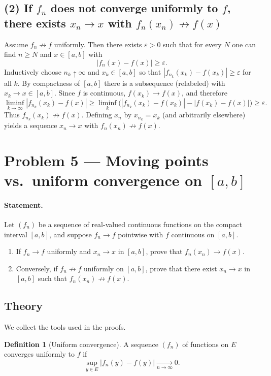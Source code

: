 \documentclass[12pt,a4paper]{article}
\theoremstyle{plain}
\theoremstyle{definition}
\newtheorem{definition}[theorem]{Definition}
\theoremstyle{remark}
\theoremstyle{remark}
\begin{document}
\subsection*{(2) If $f_n$ does not converge uniformly to $f$, there exists $x_n\to x$ with $f_n(x_n)\not\to f(x)$}
Assume $f_n\nrightarrow f$ uniformly. Then there exists $\varepsilon>0$ such that for every $N$
one can find $n\ge N$ and $x\in[a,b]$ with
\[
|f_n(x)-f(x)|\ge \varepsilon.
\]
Inductively choose $n_k\uparrow\infty$ and $x_k\in[a,b]$ so that $|f_{n_k}(x_k)-f(x_k)|\ge \varepsilon$ for all $k$.
By compactness of $[a,b]$ there is a subsequence (relabeled) with $x_k\to x\in[a,b]$.
Since $f$ is continuous, $f(x_k)\to f(x)$, and therefore
\[
\liminf_{k\to\infty} |f_{n_k}(x_k)-f(x)|
\ge \liminf_{k}\Big(|f_{n_k}(x_k)-f(x_k)|-|f(x_k)-f(x)|\Big)
\ge \varepsilon.
\]
Thus $f_{n_k}(x_k)\not\to f(x)$. Defining $x_n$ by $x_{n_k}=x_k$ (and arbitrarily elsewhere) yields a sequence $x_n\to x$
with $f_n(x_n)\not\to f(x)$.

\section*{Problem 5 — Moving points vs.\ uniform convergence on $[a,b]$}

\paragraph{Statement.}
Let $(f_n)$ be a sequence of real-valued continuous functions on the compact interval $[a,b]$,
and suppose $f_n \to f$ pointwise with $f$ continuous on $[a,b]$.
\begin{enumerate}
	\item[(i)] If $f_n \to f$ uniformly and $x_n \to x$ in $[a,b]$, prove that $f_n(x_n)\to f(x)$.
	\item[(ii)] Conversely, if $f_n \not\to f$ uniformly on $[a,b]$, prove that there exist $x_n\to x$ in $[a,b]$
	such that $f_n(x_n)\not\to f(x)$.
\end{enumerate}

\subsection*{Theory}
We collect the tools used in the proofs.

\begin{definition}[Uniform convergence]
	A sequence $(f_n)$ of functions on $E$ converges uniformly to $f$ if
	\[
	\sup_{y\in E} |f_n(y)-f(y)| \xrightarrow[n\to\infty]{} 0.
	\]
\end{definition}
\end{document}

